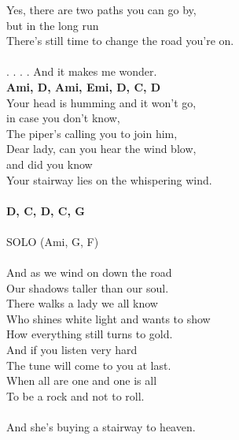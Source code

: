 Yes, there are two paths you can go by, \\
but in the long run\\
There's still time to change the road you're on.\\
\\
. . . . And it makes me wonder.\\
\footnotesize\textbf{Ami, D, Ami, Emi, D, C, D}\\
\normalsize
\newpage
Your head is humming and it won't go, \\
in case you don't know,\\
The piper's calling you to join him,\\
Dear lady, can you hear the wind blow, \\
and did you know\\
Your stairway lies on the whispering wind.\\
\\
\footnotesize\textbf{D, C, D, C, G}\\
\normalsize
\\
SOLO (Ami, G, F)\\
\\
And as we wind on down the road\\
Our shadows taller than our soul.\\
There walks a lady we all know\\
Who shines white light and wants to show\\
How everything still turns to gold.\\
And if you listen very hard\\
The tune will come to you at last.\\
When all are one and one is all\\
To be a rock and not to roll.\\
\\
And she's buying a stairway to heaven.\\